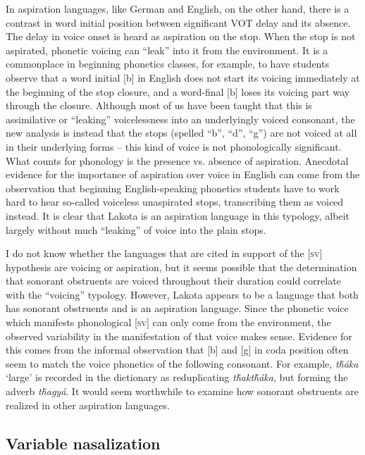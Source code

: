 \documentclass[output=paper]{LSP/langsci}
\begin{document}
In aspiration languages, like German and English, on the other hand, there is a contrast in word initial position between significant VOT delay and its absence. The delay in voice onset is heard as aspiration on the stop. When the stop is not aspirated, phonetic voicing can ``leak'' into it from the environment. It is a commonplace in beginning phonetics classes, for example, to have students observe that a word initial [b] in English does not start its voicing immediately at the beginning of the stop closure, and a word-final [b] loses its voicing part way through the closure. Although most of us have been taught that this is assimilative or ``leaking'' voicelessness into an underlyingly voiced consonant, the new analysis is instead that the stops (spelled ``b'', ``d'', ``g'') are not voiced at all in their underlying forms -- this kind of voice is not phonologically significant. What counts for phonology is the presence vs. absence of aspiration. Anecdotal evidence for the importance of aspiration over voice in English can come from the observation that beginning English-speaking phonetics students have to work hard to hear so-called voiceless unaspirated stops, transcribing them as voiced instead. It is clear that Lakota is an aspiration language in this typology, albeit largely without much ``leaking'' of voice into the plain stops.

I do not know whether the languages that are cited in support of the [\textsc{sv}] hypothesis are voicing or aspiration, but it seems possible that the determination that sonorant obstruents are voiced throughout their duration could correlate with the ``voicing'' typology. However, Lakota appears to be a language that both has sonorant obstruents and is an aspiration language. Since the phonetic voice which manifests phonological [\textsc{sv}] can only come from the environment, the observed variability in the manifestation of that voice makes sense. Evidence for this comes from the informal observation that [b] and [g] in coda position often seem to match the voice phonetics of the following consonant. For example, \textit{t\v{h}\'aka} `large' is recorded in the dictionary as reduplicating \textit{t\v{h}akt\v{h}\'aka}, but forming the adverb \textit{t\v{h}agy\'a}. It would seem worthwhile to examine how sonorant obstruents are realized in other aspiration languages.

\subsection{Variable nasalization}
\end{document}
